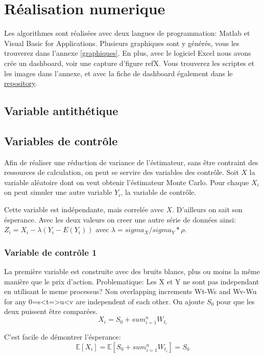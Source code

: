 \documentclass[a4paper,12pt]{scrartcl}
\begin{document}

\section{Réalisation numerique}

Les algorithmes sont réalisées avec deux langues de programmation: Matlab et Visual Basic for Applications.
Plusieurs graphiques sont y générés, vous les trouverez dans l'annexe \ref{graphiques}.
En plus, avec le logiciel Excel nous avons crée un dashboard, voir une capture d'figure ref{X}. 
Vous trouverez les scriptes et les images dans l'annexe, et avec la fiche de dashboard également dans le \href{https://github.com/matthias-10/UCO_actuariat_mini-projet}{repository}.


\subsection{Variable antithétique}
\subsection{Variables de contrôle}

Afin de réaliser une réduction de variance de l'éstimateur, sans être contraint des ressources de calculation, on peut se servire des variables des contrôle.
Soit $X$ la variable aléatoire dont on veut obtenir l'éstimateur Monte Carlo.
Pour chaque $X_i$ on peut simuler une autre variable $Y_i$, la variable de contrôle.

Cette variable est indépendante, mais correlée avec $X$.
D'ailleurs on sait son ésperance.
Avec les deux valeurs on creer une autre série de données ainsi:
$Z_i = X_i - \lambda(Y_i - E(Y_i))$ avec $\lambda = sigma_X/sigma_Y * \rho$.

\subsubsection{Variable de contrôle 1}

La première variable est construite avec des bruits blancs, plus ou moins la même manière que le prix d'action.
Problematique: Les X et Y ne sont pas independant en utilisant le meme processus?
Non overlapping increments Wt-Ws and Wv-Wu for any 0=s<t=>u<v are independent of each other.
On ajoute $S_0$ pour que les deux puissent être comparées.
$$X_i = S_0 + sum_{i=1}^{n} W_{t_i}$$

C'est facile de démontrer l'ésperance:
$$\mathbb{E}[X_i]=\mathbb{E}[S_0 + sum_{i=1}^{n} W_{t_i}] = S_0$$
\end{document}
